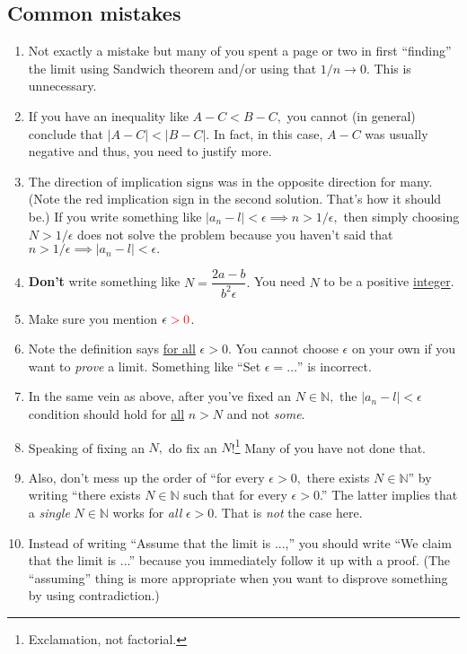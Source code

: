 \documentclass[12pt]{article}
\theoremstyle{definition}
\newcommand{\md}[1]{\left\lvert #1 \right\lvert}
\begin{document}
\subsection{Common mistakes}
\begin{enumerate}
	\item Not exactly a mistake but many of you spent a page or two in first ``finding'' the limit using Sandwich theorem and/or using that $1/n \to 0.$ This is unnecessary. 
	\item If you have an inequality like $A - C < B - C,$ you cannot (in general) conclude that $\md{A - C} < \md{B - C}.$ In fact, in this case, $A - C$ was usually negative and thus, you need to justify more.
	\item The direction of implication signs was in the opposite direction for many. (Note the red implication sign in the second solution. That's how it should be.) If you write something like $\md{a_n - l} < \epsilon \implies n > 1/\epsilon,$ then simply choosing $N > 1/\epsilon$ does not solve the problem because you haven't said that $n > 1/\epsilon \implies \md{a_n - l} < \epsilon.$
	\item \textbf{Don't} write something like $N = \dfrac{2a - b}{b^2\epsilon}.$ You need $N$ to be a positive \underline{integer}.
	\item Make sure you mention $\epsilon {\color{red}\;> 0}$.
	\item Note the definition says \underline{for all} $\epsilon > 0.$ You cannot choose $\epsilon$ on your own if you want to \emph{prove} a limit. Something like ``Set $\epsilon = \ldots$'' is incorrect.
	\item In the same vein as above, after you've fixed an $N \in \mathbb{N},$ the $\md{a_n - l} < \epsilon$ condition should hold for \underline{all} $n > N$ and not \emph{some}.
	\item Speaking of fixing an $N,$ do fix an $N$!\footnote{Exclamation, not factorial.} Many of you have not done that.
	\item Also, don't mess up the order of ``for every $\epsilon > 0,$ there exists $N \in \mathbb{N}$'' by writing ``there exists $N \in \mathbb{N}$ such that for every $\epsilon > 0$.'' The latter implies that a \emph{single} $N \in \mathbb{N}$ works for \emph{all} $\epsilon > 0.$ That is \emph{not} the case here.
	\item Instead of writing ``Assume that the limit is ...,'' you should write ``We claim that the limit is ...'' because you immediately follow it up with a proof. (The ``assuming'' thing is more appropriate when you want to disprove something by using contradiction.)
\end{enumerate}
%
%
%
\newpage
\end{document}
